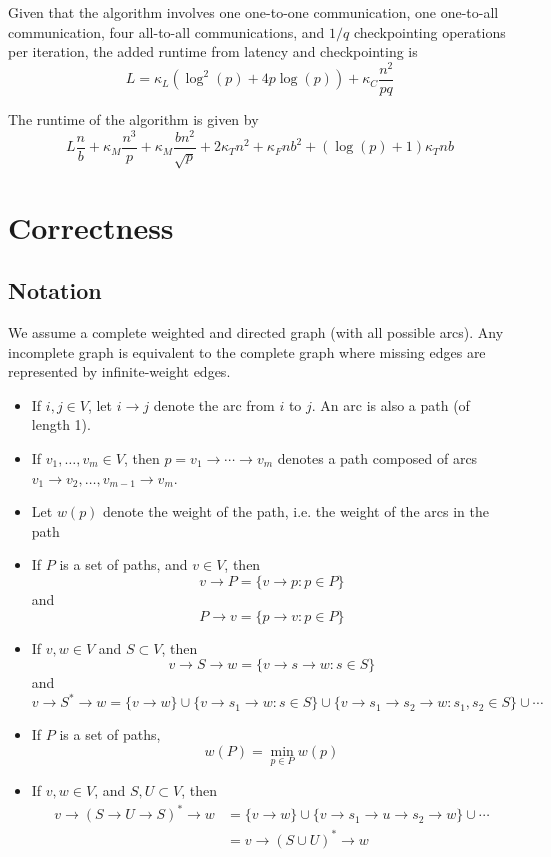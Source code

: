 \documentclass{article} %
\begin{document}
Given that the algorithm involves one one-to-one communication, one
one-to-all communication, four all-to-all communications, and $1/q$
checkpointing operations per iteration, the added runtime from latency
and checkpointing is
\[
L = \kappa_L(\log^2(p) + 4p\log(p)) + \kappa_C \frac{n^2}{pq}
\]

The runtime of the algorithm is given by
\[
L\frac{n}{b} + \kappa_M \frac{n^3}{p} + \kappa_M \frac{bn^2}{\sqrt{p}} + 2\kappa_T n^2 + \kappa_F nb^2 + (\log(p) + 1)\kappa_T nb
\]


\section{Correctness}

\subsection{Notation}

We assume a complete weighted and directed graph (with all possible
arcs).  Any incomplete graph is equivalent to the complete graph
where missing edges are represented by infinite-weight edges.

\begin{itemize}
\item If $i, j \in V$, let $i \to j$ denote the arc from $i$ to $j$.  An arc is also a path (of length 1).
\item If $v_1, \hdots, v_m \in V$, then $p = v_1\to \cdots \to v_m$  denotes a path composed of arcs $v_1 \to v_2, \hdots, v_{m-1} \to v_m$.
\item Let $w(p)$ denote the weight of the path, i.e. the weight of the arcs in the path
\item If $P$ is a set of paths, and $v \in V$, then
\[
v \to P = \{v \to p: p \in P\}
\]
and
\[
P \to v = \{p \to v: p \in P\}
\]
\item If $v, w \in V$ and $S \subset V$, then
\[ v \to S \to w = \{v \to s \to w: s \in S\}\]
and
\[
v \to S^* \to w = \{v \to w\} \cup \{v \to s_1 \to w: s \in S\} \cup \{v \to s_1 \to s_2 \to w: s_1, s_2 \in S\} \cup \cdots
\]
\item If $P$ is a set of paths,
\[
w(P) = \min_{p \in P} w(p)
\]
\item If $v, w \in V$, and $S, U \subset V$, then
\begin{align*}
v \to (S \to U \to S)^* \to w &= \{v \to w\} \cup \{v \to s_1 \to u \to s_2 \to w\} \cup \cdots\\
&= v \to (S \cup U)^* \to w
\end{align*}
\end{itemize}
\end{document}
